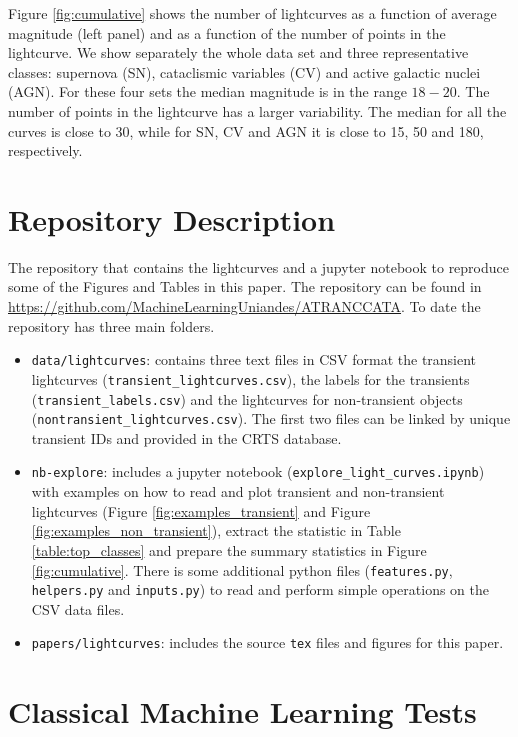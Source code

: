 \documentclass[a4paper,fleqn,usenatbib]{mnras}
\begin{document}
Figure \ref{fig:cumulative} shows the number of lightcurves as a
function of average magnitude (left panel) and as a function of the
number of points in the lightcurve.
We show separately the whole data set and three representative
classes: supernova (SN), cataclismic variables (CV) and active galactic nuclei (AGN).
For these four sets the median magnitude is in the range $18-20$. 
The number of points in the lightcurve has a larger variability.
The median for all the curves is close to 30, while for SN, CV and
AGN it is close to 15, 50 and 180, respectively.

\section{Repository Description} 
\label{sec:repository}

The repository that contains the lightcurves and a jupyter notebook
to reproduce some of the Figures and Tables in this paper.
The repository can be found in \url{https://github.com/MachineLearningUniandes/ATRANCCATA}. 
To date the repository has three main folders.
\begin{itemize}

\item \texttt{data/lightcurves}: 
contains three text files in CSV format
the transient lightcurves (\texttt{transient\_lightcurves.csv}),
the labels for the transients (\texttt{transient\_labels.csv}) and
the lightcurves for non-transient objects
(\texttt{nontransient\_lightcurves.csv}). 
The first two files can be linked by unique transient IDs and
provided in the CRTS database. 
\item \texttt{nb-explore}: includes a jupyter notebook
  (\texttt{explore\_light\_curves.ipynb}) with examples on how to read
  and plot transient and non-transient lightcurves (Figure
  \ref{fig:examples_transient} and Figure
  \ref{fig:examples_non_transient}), extract the statistic in Table
  \ref{table:top_classes} and prepare the summary statistics in Figure
  \ref{fig:cumulative}. 
  There is some additional python files (\texttt{features.py},
  \texttt{helpers.py} and \texttt{inputs.py}) to read and perform
  simple operations on the CSV data files. 
\item \texttt{papers/lightcurves}: includes the source \texttt{tex} files and
  figures for this paper. 
\end{itemize}



\section{Classical Machine Learning Tests} 
\label{sec:ml_tests}
\end{document}
